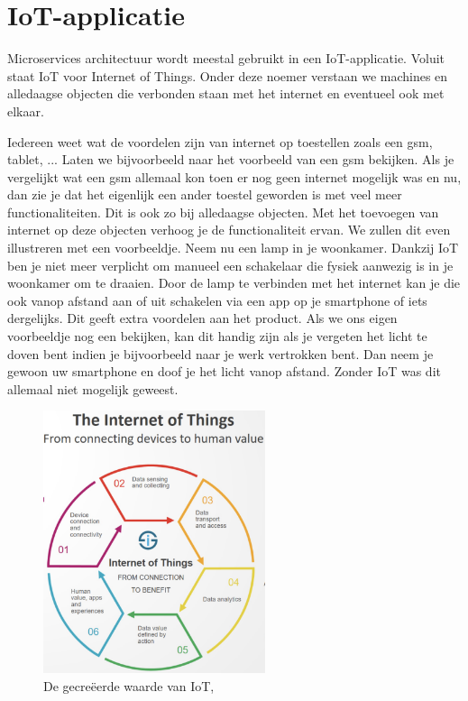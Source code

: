 \autocite{Google2019}

\section{IoT-applicatie}
Microservices architectuur wordt meestal gebruikt in een IoT-applicatie. Voluit staat IoT voor Internet of Things. Onder deze noemer verstaan we machines en alledaagse objecten die verbonden staan met het internet en eventueel ook met elkaar.

Iedereen weet wat de voordelen zijn van internet op toestellen zoals een gsm, tablet, ... Laten we bijvoorbeeld naar het voorbeeld van een gsm bekijken. Als je vergelijkt wat een gsm allemaal kon toen er nog geen internet mogelijk was en nu, dan zie je dat het eigenlijk een ander toestel geworden is met veel meer functionaliteiten. Dit is ook zo bij alledaagse objecten. Met het toevoegen van internet op deze objecten verhoog je de functionaliteit ervan. We zullen dit even illustreren met een voorbeeldje. Neem nu een lamp in je woonkamer. Dankzij IoT ben je niet meer verplicht om manueel een schakelaar die fysiek aanwezig is in je woonkamer om te draaien. Door de lamp te verbinden met het internet kan je die ook vanop afstand aan of uit schakelen via een app op je smartphone of iets dergelijks. Dit geeft extra voordelen aan het product. Als we ons eigen voorbeeldje nog een bekijken, kan dit handig zijn als je vergeten het licht te doven bent indien je bijvoorbeeld naar je werk vertrokken bent. Dan neem je gewoon uw smartphone en doof je het licht vanop afstand. Zonder IoT was dit allemaal niet mogelijk geweest.

 \begin{figure}[h!]
    \centering
    \includegraphics[width=65mm]{../IoT.png}
    \caption{De gecreëerde waarde van IoT, \autocite{i-scoop2019}}
    
\end{figure}

